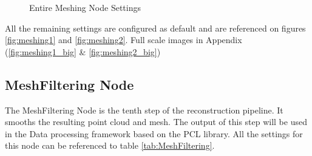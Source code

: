 \documentclass[12pt]{report}
\begin{document}
\begin{figure}[H]
  \centering
  \qquad
  \caption{Entire Meshing Node Settings}
  \label{fig:Meshingnodesettings}
\end{figure}

All the remaining settings are configured as default and are referenced on figures \ref{fig:meshing1} and \ref{fig:meshing2}. Full scale images in Appendix (\ref{fig:meshing1_big} \& \ref{fig:meshing2_big})
\enlargethispage{\baselineskip}




\subsection*{MeshFiltering Node}
The MeshFiltering Node is the tenth step of the reconstruction pipeline. It smooths the resulting point cloud and mesh.
The output of this step will be used in the Data processing framework based on the PCL library.
All the settings for this node can be referenced to table \ref{tab:MeshFiltering}.
\end{document}

